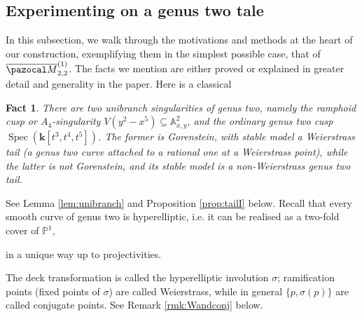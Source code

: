 \documentclass[11pt]{amsart}
\newcommand{\PP}{\mathbb P}
\renewcommand{\k}{\mathbf k}
\newcommand{\Aaff}{\mathbb A}
\newcommand{\oM}{\overline{\pazocal M}}
\theoremstyle{plain}
\newtheorem*{fact}{Fact}
\theoremstyle{definition}
\begin{document}
\subsection{Experimenting on a genus two tale}  In this subsection, we walk through the motivations and methods at the heart of our construction, exemplifying them in the simplest possible case, that of $\oM_{2,2}^{(1)}$. The facts we mention are either proved or explained in greater detail and generality in the paper. Here is a classical
\begin{fact}
 There are two unibranch singularities of genus two, namely the \emph{ramphoid cusp} or \emph{$A_4$-singularity} $V(y^2-x^5)\subseteq \Aaff^2_{x,y}$, and the ordinary genus two cusp $\operatorname{Spec}(\k[t^3,t^4,t^5])$. The former is Gorenstein, with stable model a Weierstrass tail (a genus two curve attached to a rational one at a Weierstrass point), while the latter is not Gorenstein, and its stable model is a non-Weierstrass genus two tail.
\end{fact}
See Lemma \ref{lem:unibranch} and Proposition \ref{prop:tailI} below. Recall that every smooth curve of genus two is hyperelliptic, i.e. it can be realised as a two-fold cover of $\PP^1$, 

in a unique way up to projectivities. 

The deck transformation is called the hyperelliptic involution $\sigma$; ramification points (fixed points of $\sigma$) are called Weierstrass, while in general $\{p,\sigma(p)\}$ are called conjugate points. See Remark \ref{rmk:Wandconj} below.
\end{document}
